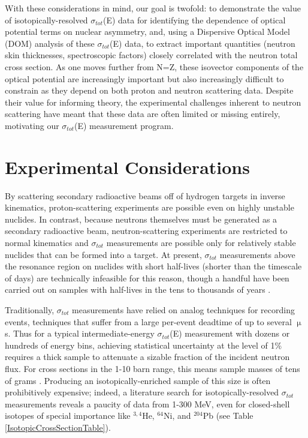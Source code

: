 \documentclass[twocolumn,secnumarabic,amssymb, nobibnotes, aps, prl,
superscriptaddress, nobalancelastpage]{revtex4}
\newcommand{\tots}{\ensuremath{\sigma_{tot}}\,\,}
\newcommand{\totEs}{\ensuremath{\sigma_{tot}}(E)\,\,}
\begin{document}
With these considerations in mind, our goal is twofold: to demonstrate the
value of isotopically-resolved \totEs data for identifying the dependence of optical 
potential terms on nuclear asymmetry, and, using a Dispersive Optical Model
(DOM) analysis of these \totEs data, to extract important quantities (neutron skin
thicknesses, spectroscopic factors) closely correlated with the neutron total
cross section.
As one moves further from N=Z, these isovector components of the optical potential
are increasingly important but also increasingly
difficult to constrain as they depend on both proton and neutron scattering
data. Despite their value for informing theory, the experimental 
challenges inherent to neutron scattering have meant that these data are often 
limited or missing entirely, motivating our \totEs measurement program.


\section{Experimental Considerations}
By scattering secondary radioactive beams off of hydrogen targets in inverse
kinematics, proton-scattering experiments are possible even on highly unstable
nuclides. In contrast, because neutrons themselves must be generated as a
secondary radioactive beam, neutron-scattering experiments are restricted to
normal kinematics and \tots measurements are possible only for relatively stable
nuclides that can be formed into a target. At present, \tots measurements above
the resonance region on nuclides with short half-lives (shorter than the timescale of
days) are technically infeasible for this reason, though a handful have been carried out on
samples with half-lives in the tens to thousands of years \cite{Poenitz1983,
Phillips1980, Foster1971}.

Traditionally, \tots measurements have relied on analog techniques for recording
events, techniques that suffer from a large per-event deadtime of
up to several $\upmu$s. Thus for a typical intermediate-energy \totEs measurement
with dozens or hundreds of energy bins, achieving statistical uncertainty at the
level of 1\% requires a thick sample to attenuate a sizable fraction of the
incident neutron flux. For cross sections in the 1-10 barn range, this means
sample masses of tens of grams \cite{Finlay1993, Abfalterer2001}.
Producing an isotopically-enriched sample of this size is often
prohibitively expensive; indeed, a literature search for isotopically-resolved
\tots measurements reveals a paucity of data from 1-300 MeV, even for
closed-shell isotopes of special importance like $^{3,4}$He, $^{64}$Ni, and
$^{204}$Pb (see Table \ref{IsotopicCrossSectionTable}).
\end{document}
